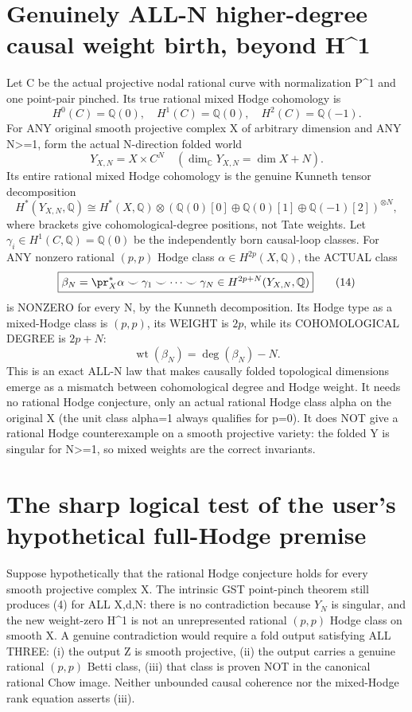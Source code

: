 \documentclass[11pt]{article}
\newcommand{\Q}{\mathbb Q}
\begin{document}
\section{Genuinely ALL-N higher-degree causal weight birth, beyond H^1}
Let C be the actual projective
nodal rational curve with normalization P^1
and one point-pair pinched. Its true rational
mixed Hodge cohomology is
\[
 H^0(C)=\Q(0),\quad
 H^1(C)=\Q(0),\quad
 H^2(C)=\Q(-1).
\]
For ANY original smooth projective complex
X of arbitrary dimension and ANY N>=1,
form the actual N-direction folded world
\[
 Y_{X,N}=X\times C^N
 \quad (\dim_{\mathbb C}Y_{X,N}=\dim X+N).
\]
Its entire rational mixed Hodge cohomology
is the genuine Kunneth tensor decomposition
\[
 \boxed{
 H^*(Y_{X,N},\Q)
   \cong H^*(X,\Q)\otimes
  (\Q(0)[0]\oplus\Q(0)[1]\oplus
                       \Q(-1)[2])^{\otimes N},
 }                                                        \tag{13}
\]
where brackets give cohomological-degree
positions, not Tate weights.
Let \(\gamma_i\in H^1(C,\Q)=\Q(0)\)
be the independently born causal-loop classes.
For ANY nonzero rational \((p,p)\) Hodge class
\(\alpha\in H^{2p}(X,\Q)\), the ACTUAL
class
\[
 \boxed{
 \beta_N=\pr_X^*\alpha\smile
      \gamma_1\smile\cdots\smile\gamma_N
 \in H^{2p+N}(Y_{X,N},\Q)
 }                                                        \tag{14}
\]
is NONZERO for every N, by the
Kunneth decomposition.
Its Hodge type as a mixed-Hodge class
is \((p,p)\), its WEIGHT is \(2p\),
while its COHOMOLOGICAL DEGREE is \(2p+N\):
\[
 \boxed{
 \operatorname{wt}(\beta_N)=
     \deg(\beta_N)-N.
 }                                                        \tag{15}
\]
This is an exact ALL-N law that makes
causally folded topological dimensions
emerge as a mismatch between
cohomological degree and Hodge weight.
It needs no rational Hodge conjecture,
only an actual rational Hodge class alpha
on the original X (the unit class
alpha=1 always qualifies for p=0).
It does NOT give a rational Hodge counterexample
on a smooth projective variety:
the folded Y is singular for N>=1,
so mixed weights are the correct invariants.

\section{The sharp logical test of the user's hypothetical full-Hodge premise}
Suppose hypothetically that the rational
Hodge conjecture holds for every
smooth projective complex X.
The intrinsic GST point-pinch theorem
still produces (4) for ALL X,d,N:
there is no contradiction because
\(Y_N\) is singular, and the new
weight-zero H^1 is not an unrepresented
rational \((p,p)\) Hodge class on smooth X.
A genuine contradiction would require
a fold output satisfying ALL THREE:
(i) the output Z is smooth projective,
(ii) the output carries a genuine rational
\((p,p)\) Betti class,
(iii) that class is proven NOT in the
canonical rational Chow image.
Neither unbounded causal coherence nor
the mixed-Hodge rank equation asserts (iii).
\end{document}
